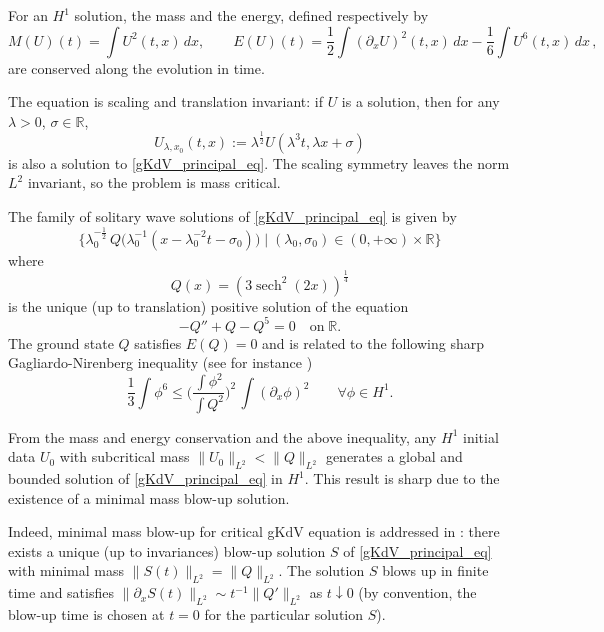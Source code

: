 \documentclass[16pt,english, oneside,reqno]{smfart}
\newcommand{\RR}{\mathbb{R}}
\DeclareMathOperator{\sech}{sech}
\begin{document}
For an $H^1$ solution, the mass and the energy, defined respectively by
\begin{equation}
    M(U)(t) = \int U^2 (t,x) \, dx, \qquad E(U)(t) = \frac 12 \int(\partial_x U)^2(t,x)\, dx - \frac 16 \int U^6(t,x)\, dx\,,
\end{equation}
are conserved along the evolution in time.
 
The equation is scaling and translation invariant: if $U$ is a solution, 
then for any $\lambda>0$, $\sigma \in \RR$,
\begin{equation}
    U_{\lambda,x_0}(t,x) := \lambda^{\frac 12}U(\lambda^3 t, \lambda x + \sigma)
\end{equation}
is also a solution to \eqref{gKdV_principal_eq}. The scaling symmetry leaves the norm $L^2$ invariant, so the problem is mass critical.

The family of solitary wave solutions of \eqref{gKdV_principal_eq} is given by 
\begin{equation}
    \Big\{ \lambda^{-\frac 12}_0 \,Q\big(\lambda^{-1}_0 (x - \lambda^{-2}_0 t - \sigma_0) \big)\;\big|\;  (\lambda_0,\sigma_0) \in (0,+\infty)\times \RR \Big\}
\end{equation}
where 
\[
Q(x) = \left( 3 \sech^2(2x) \right)^{\frac 14}
\]
is the unique (up to translation) positive solution of the equation
\begin{equation}\label{equation_of_Q}
    -Q'' + Q - Q^5 =0 \quad \text{on}\; \RR.
\end{equation}
The ground state $Q$ satisfies $E(Q) =0$ and is related to the following sharp Gagliardo-Nirenberg inequality (see for instance \cite{Weinstein-1983})
\begin{equation}\label{gagliardo-nirenberg}
    \frac 13\int \phi^6 \leq \bigg( \frac{\int \phi^2}{\int Q^2} \bigg)^2\, \int (\partial_x \phi)^2 \qquad \forall \phi \in H^1.
\end{equation}

From the mass and energy conservation and the above inequality, any $H^1$ initial data $U_0$ with subcritical mass $\|U_0\|_{L^2} < \|Q\|_{L^2}$ generates a global and bounded solution of \eqref{gKdV_principal_eq} in $H^1$. This result is sharp due to the existence of
a minimal mass blow-up solution.

Indeed, minimal mass blow-up for critical gKdV equation is addressed in \cite{MMPII}:
there exists a unique (up to invariances) blow-up solution $S$ of \eqref{gKdV_principal_eq} with minimal mass $\| S(t) \|_{L^2} = \|Q\|_{L^2}$. The solution $S$ blows up in finite time and satisfies $\|\partial_x S(t)\|_{L^2} \sim t^{-1}\|Q'\|_{L^2}$ as $t \downarrow 0$
(by convention, the blow-up time is chosen at $t=0$ for the particular solution $S$).
\end{document}

